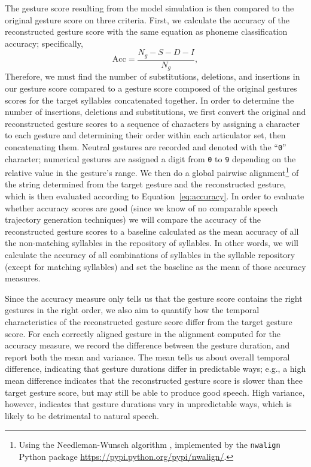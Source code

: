 The gesture score resulting from the model simulation
is then compared to the original gesture score
on three criteria.
First, we calculate the accuracy
of the reconstructed gesture score
with the same equation as phoneme classification accuracy;
specifically,
\begin{equation} \label{eq:accuracy}
  \text{Acc} = \frac{N_g - S - D - I}{N_g},
\end{equation}
Therefore, we must find the number of
substitutions, deletions, and insertions
in our gesture score compared to
a gesture score composed of
the original gestures scores
for the target syllables
concatenated together.
In order to determine the number of
insertions, deletions and substitutions,
we first convert the original
and reconstructed gesture scores
to a sequence of characters
by assigning a character to each gesture
and determining their order
within each articulator set,
then concatenating them.
Neutral gestures are recorded
and denoted with the ``\texttt{0}'' character;
numerical gestures are assigned
a digit from \texttt{0} to \texttt{9}
depending on the relative value
in the gesture's range.
We then do a global pairwise alignment\footnote{
  Using the Needleman-Wunsch algorithm \citep{needleman1970},
  implemented by the \texttt{nwalign} Python package
  \url{https://pypi.python.org/pypi/nwalign/}.}
of the string determined
from the target gesture
and the reconstructed gesture,
which is then evaluated
according to Equation~\eqref{eq:accuracy}.
In order to evaluate whether
accuracy scores are good
(since we know of no comparable
speech trajectory generation techniques)
we will compare the accuracy
of the reconstructed gesture scores
to a baseline calculated as
the mean accuracy of all the
non-matching syllables in the
repository of syllables.
In other words, we will calculate
the accuracy of all combinations
of syllables in the syllable repository
(except for matching syllables)
and set the baseline as the mean
of those accuracy measures.

Since the accuracy measure only tells us
that the gesture score contains
the right gestures in the right order,
we also aim to quantify
how the temporal characteristics
of the reconstructed gesture score
differ from the target gesture score.
For each correctly aligned gesture
in the alignment computed
for the accuracy measure,
we record the difference
between the gesture duration,
and report both the mean and variance.
The mean tells us about
overall temporal difference,
indicating that gesture durations
differ in predictable ways;
e.g., a high mean difference
indicates that
the reconstructed gesture score
is slower than thee target gesture score,
but may still be able to
produce good speech.
High variance, however,
indicates that
gesture durations vary in unpredictable ways,
which is likely to be detrimental
to natural speech.

